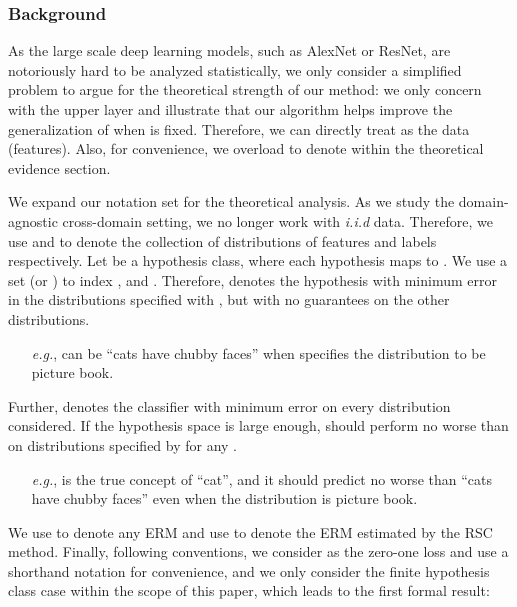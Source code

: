 \documentclass[runningheads]{llncs}
\newcommand{\method}{RSC}
\begin{document}
\subsubsection{Background}
As the large scale deep learning models, such as AlexNet or ResNet, are notoriously hard to be analyzed statistically, 
we only consider a simplified problem to argue for the theoretical strength of our method: 
we only concern with the upper layer  
and illustrate that our algorithm helps improve the generalization of  when  is fixed. 
Therefore, we can directly treat  as the data (features). 
Also, for convenience, we overload  to denote  within the theoretical evidence section.



We expand our notation set for the theoretical analysis. 
As we study the domain-agnostic cross-domain setting, we no longer work with \textit{i.i.d} data.  
Therefore, 
we use  and  to denote the collection of distributions of features and labels respectively. 
Let  be a hypothesis class, where each hypothesis  maps  to . 
We use a set  (or ) to index ,  and . 
Therefore,  denotes the hypothesis with minimum error in the distributions specified with , but with no guarantees on the other distributions. 

\begin{itemize}
\setlength{\itemindent}{.1in}
    \item [\textit{e.g.},]  can be ``cats have chubby faces'' when  specifies the distribution to be picture book. 
\end{itemize}




Further,  denotes the classifier with minimum error on every distribution considered. 
If the hypothesis space is large enough,  should perform no worse than  on distributions specified by  for any . 

\begin{itemize}
\setlength{\itemindent}{.1in}
    \item [\textit{e.g.},]  is the true concept of ``cat'', and it should predict no worse than ``cats have chubby faces'' even when the distribution is picture book. 
\end{itemize}



We use  to denote any ERM and use  to denote the ERM estimated by the \method{} method. 
Finally, following conventions, we consider  as the zero-one loss 
and use a shorthand notation  for convenience, 
and we only consider the finite hypothesis class case within the scope of this paper, which leads to the first formal result: 
\end{document}
